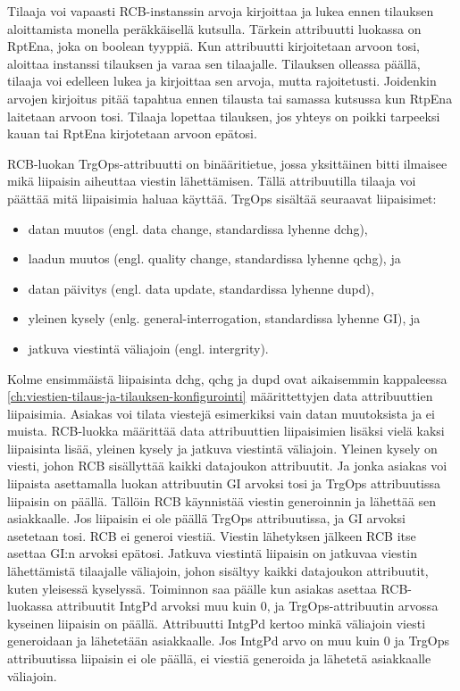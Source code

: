 Tilaaja voi vapaasti RCB-instanssin arvoja kirjoittaa ja lukea ennen tilauksen aloittamista monella peräkkäisellä kutsulla. Tärkein attribuutti luokassa on RptEna, joka on boolean tyyppiä. Kun attribuutti kirjoitetaan arvoon tosi, aloittaa instanssi tilauksen ja varaa sen tilaajalle. Tilauksen olleassa päällä, tilaaja voi edelleen lukea ja kirjoittaa sen arvoja, mutta rajoitetusti. Joidenkin arvojen kirjoitus pitää tapahtua ennen tilausta tai samassa kutsussa kun RtpEna laitetaan arvoon tosi. Tilaaja lopettaa tilauksen, jos yhteys on poikki tarpeeksi kauan tai RptEna kirjotetaan arvoon epätosi.

RCB-luokan TrgOps-attribuutti on binääritietue, jossa yksittäinen bitti ilmaisee mikä liipaisin aiheuttaa viestin lähettämisen. Tällä attribuutilla tilaaja voi päättää mitä liipaisimia haluaa käyttää. TrgOps sisältää seuraavat liipaisimet:
\begin{itemize}
	\item datan muutos (engl. data change, standardissa lyhenne dchg),
	\item laadun muutos (engl. quality change, standardissa lyhenne qchg), ja
	\item datan päivitys (engl. data update, standardissa lyhenne dupd),
	\item yleinen kysely (enlg. general-interrogation, standardissa lyhenne GI), ja 
	\item jatkuva viestintä väliajoin (engl. intergrity).
\end{itemize}

Kolme ensimmäistä liipaisinta dchg, qchg ja dupd ovat aikaisemmin kappaleessa \ref{ch:viestien-tilaus-ja-tilauksen-konfigurointi} määrittettyjen data attribuuttien liipaisimia. Asiakas voi tilata viestejä esimerkiksi vain datan muutoksista ja ei muista. RCB-luokka määrittää data attribuuttien liipaisimien lisäksi vielä kaksi liipaisinta lisää, yleinen kysely ja jatkuva viestintä väliajoin. Yleinen kysely on viesti, johon RCB sisällyttää kaikki datajoukon attribuutit. Ja jonka asiakas voi liipaista asettamalla luokan attribuutin GI arvoksi tosi ja TrgOps attribuutissa liipaisin on päällä. Tällöin RCB käynnistää viestin generoinnin ja lähettää sen asiakkaalle. Jos liipaisin ei ole päällä TrgOps attribuutissa, ja GI arvoksi asetetaan tosi. RCB ei generoi viestiä. Viestin lähetyksen jälkeen RCB itse asettaa GI:n arvoksi epätosi. Jatkuva viestintä liipaisin on jatkuvaa viestin lähettämistä tilaajalle väliajoin, johon sisältyy kaikki datajoukon attribuutit, kuten yleisessä kyselyssä. Toiminnon saa päälle kun asiakas asettaa RCB-luokassa attribuutit IntgPd arvoksi muu kuin 0, ja TrgOps-attribuutin arvossa kyseinen liipaisin on päällä. Attribuutti IntgPd kertoo minkä väliajoin viesti generoidaan ja lähetetään asiakkaalle. Jos IntgPd arvo on muu kuin 0 ja TrgOps attribuutissa liipaisin ei ole päällä, ei viestiä generoida ja lähetetä asiakkaalle väliajoin.

